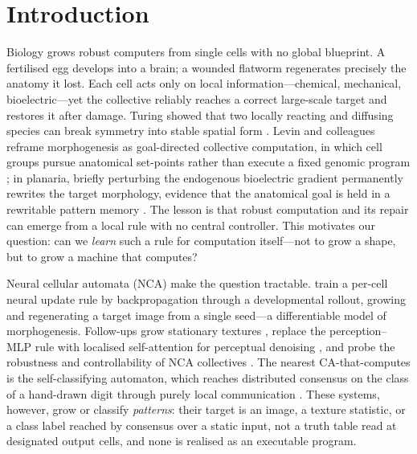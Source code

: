 \section{Introduction}

Biology grows robust computers from single cells with no global blueprint. A fertilised egg develops into a brain; a wounded flatworm regenerates precisely the anatomy it lost. Each cell acts only on local information---chemical, mechanical, bioelectric---yet the collective reliably reaches a correct large-scale target and restores it after damage. Turing showed that two locally reacting and diffusing species can break symmetry into stable spatial form \citep{turing1952chemical}. Levin and colleagues reframe morphogenesis as goal-directed collective computation, in which cell groups pursue anatomical set-points rather than execute a fixed genomic program \citep{levin2019computational,pezzulo2016topdown}; in planaria, briefly perturbing the endogenous bioelectric gradient permanently rewrites the target morphology, evidence that the anatomical goal is held in a rewritable pattern memory \citep{durant2017longterm}. The lesson is that robust computation and its repair can emerge from a local rule with no central controller. This motivates our question: can we \emph{learn} such a rule for computation itself---not to grow a shape, but to grow a machine that computes?

Neural cellular automata (NCA) make the question tractable. \citet{mordvintsev2020growing} train a per-cell neural update rule by backpropagation through a developmental rollout, growing and regenerating a target image from a single seed---a differentiable model of morphogenesis. Follow-ups grow stationary textures \citep{niklasson2021textures}, replace the perception--MLP rule with localised self-attention for perceptual denoising \citep{tesfaldet2022attention}, and probe the robustness and controllability of NCA collectives \citep{randazzo2021adversarial}. The nearest CA-that-computes is the self-classifying automaton, which reaches distributed consensus on the class of a hand-drawn digit through purely local communication \citep{randazzo2020selfclassifying}. These systems, however, grow or classify \emph{patterns}: their target is an image, a texture statistic, or a class label reached by consensus over a static input, not a truth table read at designated output cells, and none is realised as an executable program.

